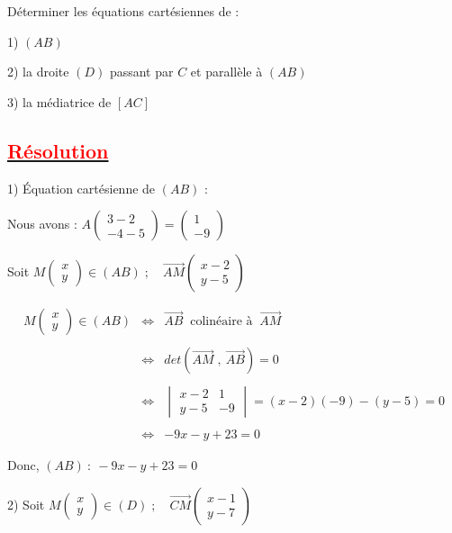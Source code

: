 \documentclass[12pt]{article}
\begin{document}
Déterminer les équations cartésiennes de :

1) $(AB)$

2) la droite $(D)$ passant par $C$ et parallèle à $(AB)$

3) la médiatrice de $[AC]$


\subsection*{\underline{\textcolor{red}{\textbf{Résolution}}}}
1) Équation cartésienne de $(AB)$ :

Nous avons : $A\begin{pmatrix} 3-2 \\ -4-5\end{pmatrix}=\begin{pmatrix} 1 \\ -9\end{pmatrix}$

Soit $M\begin{pmatrix} x \\ y\end{pmatrix}\in(AB)\;;\quad \overrightarrow{AM}\begin{pmatrix} x-2 \\ y-5\end{pmatrix}$

$$\begin{array}{rcl} M\begin{pmatrix} x \\ y\end{pmatrix}\in(AB)&\Leftrightarrow&\overrightarrow{AB}\ \text{ colinéaire à }\ \overrightarrow{AM} \\ \\ &\Leftrightarrow&det(\overrightarrow{AM}\;,\ \overrightarrow{AB})=0\\ \\ &\Leftrightarrow&\begin{vmatrix} x-2&1 \\ y-5&-9\end{vmatrix}=(x-2)(-9)-(y-5)=0\\ \\ &\Leftrightarrow&-9x-y+23=0\end{array}$$

Donc, $(AB)\ :\ -9x-y+23=0$

2) Soit $M\begin{pmatrix} x \\ y\end{pmatrix}\in(D)\;;\quad \overrightarrow{CM}\begin{pmatrix} x-1 \\ y-7\end{pmatrix}$
\end{document}
